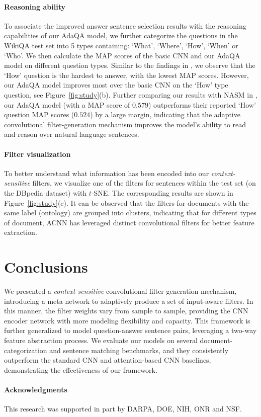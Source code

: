 \documentclass[11pt,a4paper]{article}
\begin{document}
\paragraph{Reasoning ability}
To associate the improved answer sentence selection results with the reasoning capabilities of our AdaQA model, we further categorize the questions in the WikiQA test set into 5 types containing: `What', `Where', `How', `When' or `Who'. We then calculate the MAP scores of the basic CNN and our AdaQA model on different question types. Similar to the findings in \cite{miao2016neural}, we observe that the `How' question is the hardest to answer, with the lowest MAP scores. However, our AdaQA model improves most over the basic CNN on the `How' type question, see Figure~\ref{fig:study}(b). Further comparing our results with NASM in \cite{miao2016neural}, our AdaQA model (with a MAP score of $0.579$) outperforms their reported `How' question MAP scores ($0.524$) by a large margin, indicating that the adaptive convolutional filter-generation mechanism improves the model's ability to read and reason over natural language sentences.
\vspace{-2mm}
\paragraph{Filter visualization}
To better understand what information has been encoded into our \emph{context-sensitive} filters, we visualize one of the filters for sentences within the test set  (on the DBpedia dataset) with $t$-SNE. The corresponding results are shown in Figure~\ref{fig:study}(c). It can be observed that the filters for documents with the same label (ontology) are grouped into clusters, indicating that for different types of document, ACNN has leveraged distinct convolutional filters for  better feature extraction.
\vspace{-1mm}
\section{Conclusions}
\vspace{-2mm}
We presented a \emph{context-sensitive} convolutional filter-generation mechanism, introducing a meta network to adaptively produce a set of input-aware filters. In this manner, the filter weights vary from sample to sample, providing the CNN encoder network with more modeling flexibility and capacity. This framework is further generalized to model question-answer sentence pairs, leveraging a two-way feature abstraction process. We evaluate our models on several document-categorization and sentence matching benchmarks, and they consistently outperform the standard CNN and attention-based CNN baselines, demonstrating the effectiveness of our framework.

\paragraph{Acknowledgments}
This research was supported in part by DARPA, DOE, NIH, ONR and NSF.




\appendix
\end{document}
